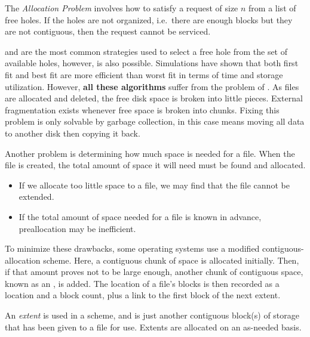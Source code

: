 \begin{definition}\label{def:Allocation_Problem}
  The \emph{Allocation Problem} involves how to satisfy a request of size $n$ from a list of free holes.
  If the holes are not organized, i.e.\ there are enough blocks but they are not contiguous, then the request cannot be serviced.
\end{definition}

 and  are the most common strategies used to select a free hole from the set of available holes, however,  is also possible.
Simulations have shown that both first fit and best fit are more efficient than worst fit in terms of time and storage utilization.
However, \textbf{all these algorithms} suffer from the problem of .
As files are allocated and deleted, the free disk space is broken into little pieces.
External fragmentation exists whenever free space is broken into chunks.
Fixing this problem is only solvable by garbage collection, in this case means moving all data to another disk then copying it back.

Another problem is determining how much space is needed for a file.
When the file is created, the total amount of space it will need must be found and allocated.
\begin{itemize}[noitemsep]
\item If we allocate too little space to a file, we may find that the file cannot be extended.
\item If the total amount of space needed for a file is known in advance, preallocation may be inefficient.
\end{itemize}

To minimize these drawbacks, some operating systems use a modified contiguous-allocation scheme.
Here, a contiguous chunk of space is allocated initially.
Then, if that amount proves not to be large enough, another chunk of contiguous space, known as an , is added.
The location of a file’s blocks is then recorded as a location and a block count, plus a link to the first block of the next extent.

\begin{definition}[Extent]\label{def:Extent}
  An \emph{extent} is used in a  scheme, and is just another contiguous block(s) of storage that has been given to a file for use.
  Extents are allocated on an as-needed basis.
\end{definition}

